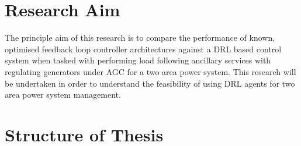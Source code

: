 \section{Research Aim}
The principle aim of this research is to compare the performance of known, optimised feedback loop controller architectures against a DRL based control system when tasked with performing load following ancillary services with regulating generators under AGC for a two area power system. This research will be undertaken in order to understand the feasibility of using DRL agents for two area power system management.

\section{Structure of Thesis}